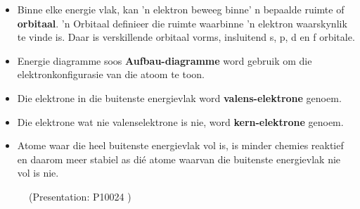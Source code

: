 \begin{itemize}[noitemsep]
\label{m38741*uid179}\item Binne elke energie vlak, kan 'n elektron beweeg binne' n bepaalde ruimte of \textbf{orbitaal}. 'n Orbitaal definieer die ruimte waarbinne 'n elektron waarskynlik te vinde is. Daar is verskillende orbitaal vorms, insluitend s, p, d en f orbitale.
\label{m38741*uid180}\item Energie diagramme soos \textbf{Aufbau-diagramme} word gebruik om die elektronkonfigurasie van die atoom te toon.
\label{m38741*uid181}\item Die elektrone in die buitenste energievlak word \textbf{valens-elektrone} genoem.
\label{m38741*uid182}\item Die elektrone wat nie valenselektrone is nie, word \textbf{kern-elektrone} genoem.
\label{m38741*uid183}\item Atome waar die heel buitenste energievlak vol is, is minder chemies reaktief en daarom meer stabiel as dié atome waarvan die buitenste energievlak nie vol is nie.
\end{itemize}
\label{m38741*eip-867}
    \setcounter{subfigure}{0}
	\begin{figure}[H] %
    \label{m38741*slidesharemedia2}\label{m38741*slideshareflash2}
             { (Presentation:  P10024 )}
 \end{figure}       \par \label{m38741*secfhsst!!!underscore!!!id1140}
            

